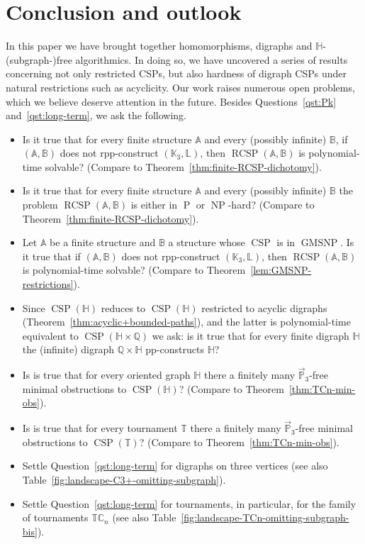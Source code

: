 \documentclass{article}
\theoremstyle{definition}
\theoremstyle{remark}
\DeclareMathOperator{\NP}{NP}
\DeclareMathOperator{\cP}{P}
\DeclareMathOperator{\CSP}{CSP}
\DeclareMathOperator{\RCSP}{RCSP}
\DeclareMathOperator{\GMSNP}{GMSNP}
\newcommand{\bA}{{\mathbb A}}
\newcommand{\bB}{{\mathbb B}}
\newcommand{\bC}{{\mathbb C}}
\newcommand{\bH}{{\mathbb H}}
\newcommand{\bK}{{\mathbb K}}
\newcommand{\bL}{{\mathbb L}}
\newcommand{\bP}{{\mathbb P}}
\newcommand{\bQ}{{\mathbb Q}}
\newcommand{\bT}{{\mathbb T}}
\begin{document}
\section{Conclusion and outlook}

In this paper we have brought together homomorphisms, digraphs and $\bH$-(subgraph-)free algorithmics. 
In doing so, we have uncovered a series of results concerning not only restricted CSPs, but also 
hardness of digraph CSPs under natural restrictions such as acyclicity. Our work raises numerous open 
problems, which we believe deserve attention in the future.
Besides Questions~\ref{qst:Pk} and~\ref{qst:long-term}, we ask the following.

\begin{itemize}
    \item Is it true that for every finite structure $\bA$ and every (possibly infinite) $\bB$,
    if $(\bA,\bB)$ does not rpp-construct $(\bK_3,\bL)$, then $\RCSP(\bA,\bB)$ is
    polynomial-time solvable? (Compare to Theorem~\ref{thm:finite-RCSP-dichotomy}).
    \item Is it true that for every finite structure $\bA$ and every (possibly infinite) $\bB$
    the problem $\RCSP(\bA,\bB)$ is either in $\cP$ or $\NP$-hard?
    (Compare to Theorem~\ref{thm:finite-RCSP-dichotomy}).
    \item Let $\bA$ be a finite structure and $\bB$ a structure whose $\CSP$ is in $\GMSNP$. 
    Is it true that if $(\bA,\bB)$ does not rpp-construct $(\bK_3,\bL)$, then $\RCSP(\bA,\bB)$
    is polynomial-time solvable? (Compare to Theorem~\ref{lem:GMSNP-restrictions}).
    \item  Since $\CSP(\bH)$ reduces to $\CSP(\bH)$ restricted to acyclic digraphs
    (Theorem~\ref{thm:acyclic+bounded-paths}),  and the latter is polynomial-time equivalent
    to $\CSP(\bH\times \bQ)$ we ask: is it true that for every finite digraph $\bH$ the (infinite)
    digraph $\bQ\times \bH$ pp-constructs $\bH$? 
    \item Is is true that for every oriented graph $\bH$ there a finitely many 
    $\vec{\bP}_3$-free minimal obstructions to $\CSP(\bH)$? (Compare to Theorem~\ref{thm:TCn-min-obs}).
    \item Is is true that for every tournament $\bT$ there a finitely many 
    $\vec{\bP}_3$-free minimal obstructions to $\CSP(\bT)$? (Compare to Theorem~\ref{thm:TCn-min-obs}).
    \item Settle Question~\ref{qst:long-term} for digraphs on three vertices (see also Table~\ref{fig:landscape-C3+-omitting-subgraph}).
    \item Settle Question~\ref{qst:long-term} for tournaments, in particular,
    for the family of tournaments $\bT\bC_n$ (see also Table~\ref{fig:landscape-TCn-omitting-subgraph-bis}).
\end{itemize}
\end{document}

